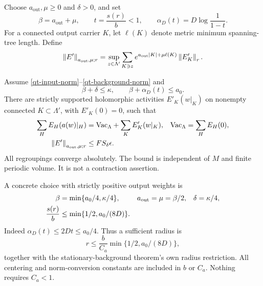 Choose $a_{\mathrm{out}},\mu\ge0$ and $\delta>0$, and set
\begin{equation}\label{qt-budget-notation}
 \beta=a_{\mathrm{out}}+\mu,\qquad
 t=\frac{s(r)}b<1,\qquad
 \alpha_D(t)=D\log\frac1{1-t}.
\end{equation}
For a connected output carrier $K$, let $\ell(K)$ denote metric
minimum spanning-tree length. Define
\begin{equation}\label{qt-output-norm}
 \left\|E'\right\|_{a_{\mathrm{out}},\mu;r}
 =\sup_{z\in\Lambda'}\sum_{K\ni z}
      e^{a_{\mathrm{out}}|K|+\mu\ell(K)}\left\|E'_K\right\|_r.
\end{equation}

\begin{theorem}\label{qt-theorem}
Assume \eqref{qt-input-norm}--\eqref{qt-background-norm} and
\begin{equation}\label{qt-budget}
 \beta+\delta\le\kappa,\qquad
 \beta+\alpha_D(t)\le a_0.
\end{equation}
There are strictly supported holomorphic activities $E'_K(w|_K)$
on nonempty connected $K\subset\Lambda'$, with $E'_K(0)=0$, such that
\begin{align}
 \sum_H E_H(a(w)|_H)
   &=\mathrm{Vac}_\Lambda+\sum_K E'_K(w|_K),
 &\mathrm{Vac}_\Lambda&=\sum_H E_H(0),                 \label{qt-exact-identity}\\
 \left\|E'\right\|_{a_{\mathrm{out}},\mu;r}
   &\le F S_\delta\epsilon.                            \label{qt-transport-bound}
\end{align}
All regroupings converge absolutely. The bound is independent of
$M$ and finite periodic volume. It is not a contraction assertion.
\end{theorem}

A concrete choice with strictly positive output weights is
\begin{align}
 \beta&=\min\{a_0/4,\kappa/4\},
 &a_{\mathrm{out}}&=\mu=\beta/2,
 &\delta&=\kappa/4,\notag\\
 \frac{s(r)}b&\le\min\{1/2,a_0/(8D)\}.                 \label{qt-concrete-budget}
\end{align}
Indeed $\alpha_D(t)\le2Dt\le a_0/4$. Thus a sufficient radius is
\begin{equation}\label{qt-radius}
 r\le\frac b{C_a}\min\{1/2,a_0/(8D)\},
\end{equation}
together with the stationary-background theorem's own radius
restriction. All centering and norm-conversion constants are included
in $b$ or $C_a$. Nothing requires $C_a<1$.

